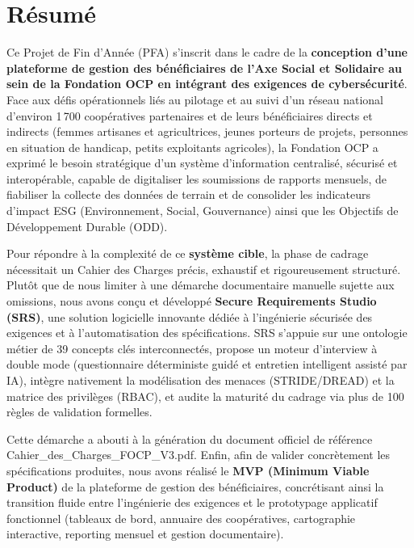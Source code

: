 \chapter*{Résumé}

Ce Projet de Fin d'Année (PFA) s'inscrit dans le cadre de la \textbf{conception d'une plateforme de gestion des bénéficiaires de l'Axe Social et Solidaire au sein de la Fondation OCP en intégrant des exigences de cybersécurité}. Face aux défis opérationnels liés au pilotage et au suivi d'un réseau national d'environ 1\,700 coopératives partenaires et de leurs bénéficiaires directs et indirects (femmes artisanes et agricultrices, jeunes porteurs de projets, personnes en situation de handicap, petits exploitants agricoles), la Fondation OCP a exprimé le besoin stratégique d'un système d'information centralisé, sécurisé et interopérable, capable de digitaliser les soumissions de rapports mensuels, de fiabiliser la collecte des données de terrain et de consolider les indicateurs d'impact ESG (Environnement, Social, Gouvernance) ainsi que les Objectifs de Développement Durable (ODD).

Pour répondre à la complexité de ce \textbf{système cible}, la phase de cadrage nécessitait un Cahier des Charges précis, exhaustif et rigoureusement structuré. Plutôt que de nous limiter à une démarche documentaire manuelle sujette aux omissions, nous avons conçu et développé \textbf{Secure Requirements Studio (SRS)}, une solution logicielle innovante dédiée à l'ingénierie sécurisée des exigences et à l'automatisation des spécifications. SRS s'appuie sur une ontologie métier de 39 concepts clés interconnectés, propose un moteur d'interview à double mode (questionnaire déterministe guidé et entretien intelligent assisté par IA), intègre nativement la modélisation des menaces (STRIDE/DREAD) et la matrice des privilèges (RBAC), et audite la maturité du cadrage via plus de 100 règles de validation formelles.

Cette démarche a abouti à la génération du document officiel de référence {\ttfamily Cahier\allowbreak\_\allowbreak des\allowbreak\_\allowbreak Charges\allowbreak\_\allowbreak FOCP\allowbreak\_\allowbreak V3.pdf}. Enfin, afin de valider concrètement les spécifications produites, nous avons réalisé le \textbf{MVP (Minimum Viable Product)} de la plateforme de gestion des bénéficiaires, concrétisant ainsi la transition fluide entre l'ingénierie des exigences et le prototypage applicatif fonctionnel (tableaux de bord, annuaire des coopératives, cartographie interactive, reporting mensuel et gestion documentaire).

